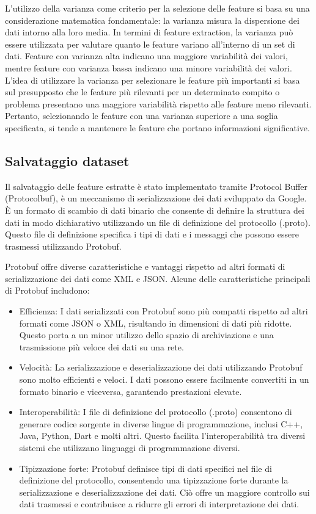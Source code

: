\documentclass[a4paper,12pt]{report}
\begin{document}
      L'utilizzo della varianza come criterio per la selezione delle feature si basa su una considerazione matematica fondamentale:
      la varianza misura la dispersione dei dati intorno alla loro media.
      In termini di feature extraction, la varianza può essere utilizzata 
      per valutare quanto le feature variano all'interno di un set di dati.
      Feature con varianza alta indicano una maggiore variabilità dei valori,
      mentre feature con varianza bassa indicano una minore variabilità dei valori.
      L'idea di utilizzare la varianza per selezionare le feature 
      più importanti si basa sul presupposto che le feature più rilevanti 
      per un determinato compito o problema presentano una maggiore variabilità rispetto alle feature meno rilevanti.
      Pertanto, selezionando le feature con una varianza superiore a una soglia specificata, 
      si tende a mantenere le feature che portano informazioni significative.
      \subsection{Salvataggio dataset}
      Il salvataggio delle feature estratte è stato implementato tramite Protocol Buffer (Protocolbuf),
      è un meccanismo di serializzazione dei dati sviluppato da Google.
      È un formato di scambio di dati binario che consente di definire la struttura 
      dei dati in modo dichiarativo utilizzando un file di definizione del protocollo (.proto).
      Questo file di definizione specifica i tipi di dati e i messaggi che possono essere trasmessi utilizzando Protobuf.

      Protobuf offre diverse caratteristiche e vantaggi rispetto ad altri formati di serializzazione dei dati come XML e JSON.
      Alcune delle caratteristiche principali di Protobuf includono:
      \begin{itemize}
        \item Efficienza: I dati serializzati con Protobuf sono più compatti rispetto ad altri formati come JSON o XML, risultando in dimensioni di dati più ridotte. Questo porta a un minor utilizzo dello spazio di archiviazione e una trasmissione più veloce dei dati su una rete.
        \newpage
        \item Velocità: La serializzazione e deserializzazione dei dati utilizzando Protobuf sono molto efficienti e veloci. I dati possono essere facilmente convertiti in un formato binario e viceversa, garantendo prestazioni elevate.
        \item Interoperabilità: I file di definizione del protocollo (.proto) consentono di generare codice sorgente in diverse lingue di programmazione, inclusi C++, Java, Python, Dart e molti altri. Questo facilita l'interoperabilità tra diversi sistemi che utilizzano linguaggi di programmazione diversi.
        \item Tipizzazione forte: Protobuf definisce tipi di dati specifici nel file di definizione del protocollo, consentendo una tipizzazione forte durante la serializzazione e deserializzazione dei dati. Ciò offre un maggiore controllo sui dati trasmessi e contribuisce a ridurre gli errori di interpretazione dei dati.
      \end{itemize}
      \newpage
\end{document}
